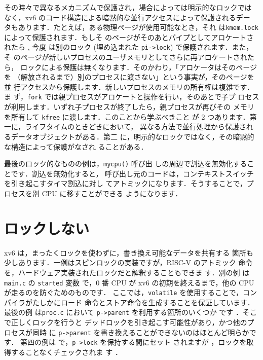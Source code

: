 その時々で異なるメカニズムで保護され，場合によっては明示的なロックでは
なく，xv6 のコード構造による暗黙的な並行アクセスによって保護されるデー
タもあります．たとえば，ある物理ページが使用可能なとき，それ
は\texttt{kmem.lock}  によって保護されます．もしそ
のページがそのあとパイプとしてアロケートされたら , 今度
は別のロック (埋め込まれた \texttt{pi->lock}) で保護されます．また，そ
のページが新しいプロセスのユーザメモリとしてさらに再アロケートされたら，
ロックによる保護は無くなります．そのかわり，「アロケータはそのページを
（解放されるまで）別のプロセスに渡さない」という事実が，そのページを並
行アクセスから保護します．新しいプロセスのメモリの所有権は複雑です．ま
ず，\texttt{fork} では親プロセスがアロケートと操作を行い，そのあとで子プ
ロセスが利用します．いずれ子プロセスが終了したら，親プロセスが再びその
メモリを所有して \texttt{kfree} に渡します．このことから学ぶべきこと
が 2 つあります．第一に，ライフタイムのときどきにおいて，
異なる方法で並行処理から保護されるデータオブジェクトがある．第二
に，明示的なロックではなく，その暗黙的な構造によって保護がなされ
ることがある．

最後のロック的なものの例は，\texttt{mycpu()}  呼び出
しの周辺で割込を無効化することです．割込を無効化すると，
呼び出し元のコードは，コンテキストスイッチを引き起こすタイマ割込に対し
てアトミックになります．そうすることで，プロセスを別 CPU に移すことができる
ようになります．

\section{ロックしない}

xv6 は，まったくロックを使わずに，書き換え可能なデータを共有する
箇所も少しあります．一例はスピンロックの実装ですが，RISC-V のアトミック
命令を，ハードウェア実装されたロックだと解釈することもできま
す．別の例
は \texttt{main.c} の \texttt{started} 変数 
 で，0 番
CPU が xv6 の初期を終えるまで，他の CPU が走るのを防ぐためのものです．
ここでは，\texttt{volatile} を使用することで，コンパイラがたしかにロード
命令とストア命令を生成することを保証しています．最後の例
は\texttt{proc.c} において \texttt{p->parent} を利用する箇所のいくつか
です 
．そこで正しくロックを行うと
デッドロックを引き起こす可能性があり，かつ他のプロセスが同時
に \texttt{p->parent} を書き換えることができないのはほとんど明らかです．
第四の例は  で，\texttt{p->lock} を保持する間にセット
されますが ，ロックを取得することなくチェックされま
す ．

